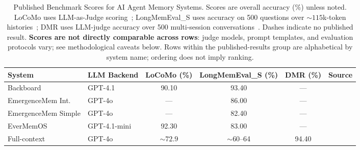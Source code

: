 

\begin{table}[!t]
\centering
\caption{Published Benchmark Scores for AI Agent Memory Systems.
Scores are overall accuracy (\%) unless noted.
LoCoMo uses LLM-as-Judge scoring~\cite{maharana2024locomo};
LongMemEval\_S uses accuracy on 500 questions over ${\sim}115$k-token histories~\cite{wu2025longmemeval};
DMR uses LLM-judge accuracy over 500 multi-session conversations~\cite{packer2023memgpt}.
Dashes indicate no published result.
\textbf{Scores are not directly comparable across rows}: judge models, prompt templates, and evaluation protocols vary; see methodological caveats below.
Rows within the published-results group are alphabetical by system name; ordering does not imply ranking.}
\label{tab:benchmark-comparison}
\begin{adjustbox}{max width=\textwidth}
\begin{threeparttable}
\begin{tabular}{@{}llcccl@{}}
\toprule
\textbf{System} & \textbf{LLM Backend} & \textbf{LoCoMo (\%)} & \textbf{LongMemEval\_S (\%)} & \textbf{DMR (\%)} & \textbf{Source} \\
\midrule
Backboard            & GPT-4.1\tnote{a}  & 90.10                & 93.40\tnote{b}  & ---   & \cite{backboard2025locomo,backboard2026longmemeval} \\
EmergenceMem Int.    & GPT-4o            & ---                  & 86.00           & ---   & \cite{emergence2025longmemeval} \\
EmergenceMem Simple  & GPT-4o            & ---                  & 82.40           & ---   & \cite{emergence2025longmemeval} \\
EverMemOS            & GPT-4.1-mini      & 92.30\tnote{c}       & 83.00           & ---   & \cite{evermemos2025} \\
Full-context         & GPT-4o            & ${\sim}72.9$\tnote{f}& ${\sim}60$--64  & 94.40\tnote{e} & \cite{maharana2024locomo,wu2025longmemeval,dempsey2025graphiti} \\

\end{tabular}
\end{threeparttable}
\end{adjustbox}
\end{table}
